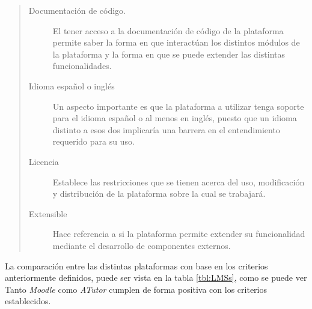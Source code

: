     \begin{quote}
    \begin{description}
    \item[Documentación de código.] El tener acceso a la documentación de código de
            la plataforma permite saber la forma en que interactúan los distintos
            módulos de la plataforma y la forma en que se puede extender las distintas
            funcionalidades.

    \item[Idioma español o inglés] Un aspecto importante es que la plataforma a utilizar
            tenga soporte para el idioma español o al menos en inglés, puesto que un
            idioma distinto a esos dos implicaría una barrera en el entendimiento requerido
            para su uso.

    \item[Licencia] Establece las restricciones que se tienen acerca del uso, modificación
            y distribución de la plataforma sobre la cual se trabajará.

    \item[Extensible] Hace referencia a si la plataforma permite extender su funcionalidad
            mediante el desarrollo de componentes externos.
    \end{description}
    \end{quote}

 \noindent La comparación entre las distintas plataformas con base en los criterios
 anteriormente definidos, puede ser vista en la tabla \ref{tbl:LMSs}, como se puede
 ver Tanto {\it Moodle} como {\it ATutor} cumplen de forma positiva con los criterios
 establecidos.

 \clearpage



